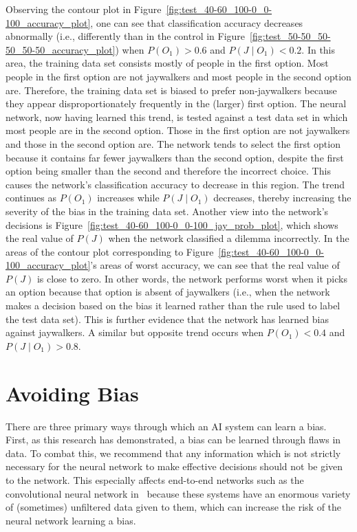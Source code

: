 \documentclass[paper=a4paper]{report}
\begin{document}
Observing the contour plot in Figure~\ref{fig:test_40-60_100-0_0-100_accuracy_plot}, one can see
that classification accuracy decreases abnormally (i.e., differently than in the control in
Figure~\ref{fig:test_50-50_50-50_50-50_accuracy_plot}) when $P(O_1) > 0.6$ and $P(J \mid O_1) <
0.2$. In this area, the training data set consists mostly of people in the first option. Most people
in the first option are not jaywalkers and most people in the second option are. Therefore, the
training data set is biased to prefer non-jaywalkers because they appear disproportionately
frequently in the (larger) first option. The neural network, now having learned this trend, is
tested against a test data set in which most people are in the second option. Those in the first
option are not jaywalkers and those in the second option are. The network tends to select the first
option because it contains far fewer jaywalkers than the second option, despite the first option
being smaller than the second and therefore the incorrect choice. This causes the network's
classification accuracy to decrease in this region. The trend continues as $P(O_1)$ increases while
$P(J \mid O_1)$ decreases, thereby increasing the severity of the bias in the training data set.
Another view into the network's decisions is Figure~\ref{fig:test_40-60_100-0_0-100_jay_prob_plot},
which shows the real value of $P(J)$ when the network classified a dilemma incorrectly. In the areas
of the contour plot corresponding to Figure~\ref{fig:test_40-60_100-0_0-100_accuracy_plot}'s areas
of worst accuracy, we can see that the real value of $P(J)$ is close to zero. In other words, the
network performs worst when it picks an option because that option is absent of jaywalkers (i.e.,
when the network makes a decision based on the bias it learned rather than the rule used to label
the test data set). This is further evidence that the network has learned bias against jaywalkers. A
similar but opposite trend occurs when $P(O_1) < 0.4$ and $P(J \mid O_1) > 0.8$.

\FloatBarrier
\section{Avoiding Bias}

There are three primary ways through which an AI system can learn a bias. First, as this research
has demonstrated, a bias can be learned through flaws in data. To combat this, we recommend that any
information which is not strictly necessary for the neural network to make effective decisions
should not be given to the network. This especially affects end-to-end networks such as the
convolutional neural network in~\cite{bojarski2016end} because these systems have an enormous
variety of (sometimes) unfiltered data given to them, which can increase the risk of the neural
network learning a bias.
\end{document}
